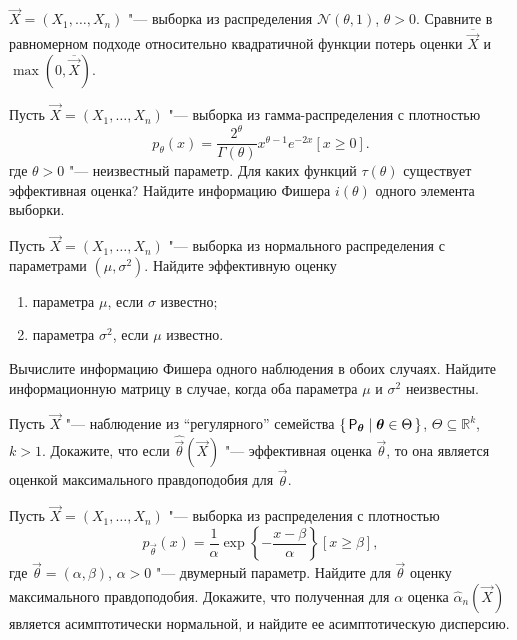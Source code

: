 \begin{problem}
    $\vec{X} = (X_{1}, \ldots, X_{n})$ "--- выборка из распределения $\mathcal{N}(\theta, 1)$, $\theta > 0$. Сравните в равномерном подходе относительно квадратичной функции потерь оценки $\overline{\vec{X}}$ и $\max(0, \overline{\vec{X}})$.
\end{problem}

\begin{problem}
    Пусть $\vec{X} = (X_{1}, \ldots, X_{n})$ "--- выборка из гамма-распределения с плотностью
    \[
        p_{\theta}(x) 
        = \frac{2^{\theta}}{\Gamma(\theta)}x^{\theta - 1}e^{-2x}[x \geq 0].
    \]
    где $\theta > 0$ "--- неизвестный параметр. Для каких функций $\tau(\theta)$ существует эффективная оценка? Найдите информацию Фишера $i(\theta)$ одного элемента выборки.
\end{problem}

\begin{problem}
    Пусть $\vec{X} = (X_{1}, \ldots, X_{n})$ "--- выборка из нормального распределения с параметрами $(\mu, \sigma^{2})$. Найдите эффективную оценку
    \begin{enumerate}[label=(\alph*)]
        \item параметра $\mu$, если $\sigma$ известно;
        \item параметра $\sigma^{2}$, если $\mu$ известно.
    \end{enumerate}
    Вычислите информацию Фишера одного наблюдения в обоих случаях. Найдите информационную матрицу в случае, когда оба параметра $\mu$ и $\sigma^{2}$ неизвестны.
\end{problem}

\begin{problem}
    Пусть $\vec{X}$ "--- наблюдение из ``регулярного'' семейства $\set{\mathsf{P}_{\bm{\theta}} \mid \bm{\theta} \in \Theta}$, $\Theta \subseteq \mathbb{R}^{k}$, $k > 1$. Докажите, что если $\hat{\vec{\theta}}(\vec{X})$ "--- эффективная оценка $\vec{\theta}$, то она является оценкой максимального правдоподобия для $\vec{\theta}$.
\end{problem}

\begin{problem}
    Пусть $\vec{X} = (X_{1}, \ldots, X_{n})$ "--- выборка из распределения с плотностью
    \[
        p_{\vec{\theta}}(x) = \frac{1}{\alpha}\exp\left\{-\frac{x - \beta}{\alpha}\right\}[x \geq \beta],
    \]
    где $\vec{\theta} = (\alpha, \beta)$, $\alpha > 0$ "--- двумерный параметр. Найдите для $\vec{\theta}$ оценку максимального правдоподобия. Докажите, что полученная для $\alpha$ оценка $\hat{\alpha}_{n}(\vec{X})$ является асимптотически нормальной, и найдите ее асимптотическую дисперсию.
\end{problem}